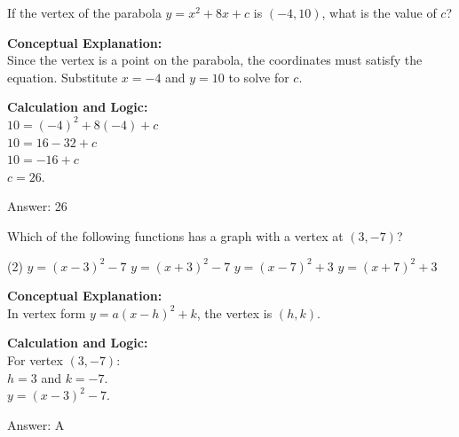 \documentclass[11pt,paper=a4,answers]{exam}
\begin{document}
\begin{questions}
\question
If the vertex of the parabola $y = x^2 + 8x + c$ is $(-4, 10)$, what is the value of $c$?

\begin{solution}
\textbf{Conceptual Explanation:} \\
Since the vertex is a point on the parabola, the coordinates must satisfy the equation. Substitute $x = -4$ and $y = 10$ to solve for $c$.

\vspace{20pt}

\textbf{Calculation and Logic:} \\
$10 = (-4)^2 + 8(-4) + c$ \\
$10 = 16 - 32 + c$ \\
$10 = -16 + c$ \\
$c = 26$.

\vspace{25pt}

Answer: \colorbox{yellow!100}{26}
\end{solution}

\vspace{40pt}

\question
Which of the following functions has a graph with a vertex at $(3, -7)$?
\begin{tasks}(2)
    \task $y = (x-3)^2 - 7$
    \task $y = (x+3)^2 - 7$
    \task $y = (x-7)^2 + 3$
    \task $y = (x+7)^2 + 3$
\end{tasks}

\begin{solution}
\textbf{Conceptual Explanation:} \\
In vertex form $y = a(x-h)^2 + k$, the vertex is $(h, k)$.

\vspace{20pt}

\textbf{Calculation and Logic:} \\
For vertex $(3, -7)$: \\
$h = 3$ and $k = -7$. \\
$y = (x - 3)^2 - 7$.

\vspace{25pt}

Answer: \colorbox{yellow!100}{A}
\end{solution}

\vspace{40pt}


\end{questions}
\end{document}
